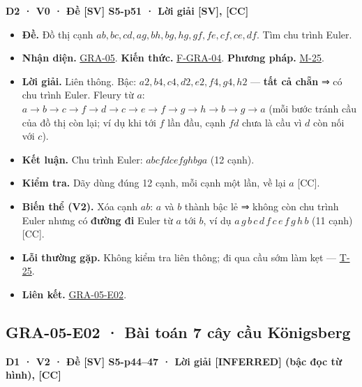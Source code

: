 \documentclass[
  10pt,
  twoside,openany]{book}
\providecommand{\tightlist}{%
  \setlength{\itemsep}{0pt}\setlength{\parskip}{0pt}}
\begin{document}
\textbf{D2 · V0 · Đề {[}SV{]} S5-p51 · Lời giải {[}SV{]}, {[}CC{]}}

\begin{itemize}
\tightlist
\item
  \textbf{Đề.} Đồ thị cạnh
  \(ab, bc, cd, ag, bh, bg, hg, gf, fe, cf, ce, df\). Tìm chu trình
  Euler.
\item
  \textbf{Nhận diện.} \protect\hyperlink{GRA-05}{GRA-05}. \textbf{Kiến
  thức.} \protect\hyperlink{F-GRA-04}{F-GRA-04}. \textbf{Phương pháp.}
  \protect\hyperlink{M-25}{M-25}.
\item
  \textbf{Lời giải.} Liên thông. Bậc: \(a2, b4, c4, d2, e2, f4, g4, h2\)
  --- \textbf{tất cả chẵn} ⇒ có chu trình Euler. Fleury từ \(a\):
  \(a\to b\to c\to f\to d\to c\to e\to f\to g\to h\to b\to g\to a\) (mỗi
  bước tránh cầu của đồ thị còn lại; ví dụ khi tới \(f\) lần đầu, cạnh
  \(fd\) chưa là cầu vì \(d\) còn nối với \(c\)).
\item
  \textbf{Kết luận.} Chu trình Euler: \(abcfdcefghbga\) (12 cạnh).
\item
  \textbf{Kiểm tra.} Dãy dùng đúng 12 cạnh, mỗi cạnh một lần, về lại
  \(a\) {[}CC{]}.
\item
  \textbf{Biến thể (V2).} Xóa cạnh \(ab\): \(a\) và \(b\) thành bậc lẻ ⇒
  không còn chu trình Euler nhưng có \textbf{đường đi} Euler từ \(a\)
  tới \(b\), ví dụ \(a\,g\,b\,c\,d\,f\,c\,e\,f\,g\,h\,b\) (11 cạnh)
  {[}CC{]}.
\item
  \textbf{Lỗi thường gặp.} Không kiểm tra liên thông; đi qua cầu sớm làm
  kẹt --- \protect\hyperlink{T-25}{T-25}.
\item
  \textbf{Liên kết.} \protect\hyperlink{GRA-05-E02}{GRA-05-E02}.
\end{itemize}

\hypertarget{GRA-05-E02}{%
\subsection{GRA-05-E02 · Bài toán 7 cây cầu
Königsberg}\label{GRA-05-E02}}

\textbf{D1 · V2 · Đề {[}SV{]} S5-p44--47 · Lời giải {[}INFERRED{]} (bậc
đọc từ hình), {[}CC{]}}
\end{document}
